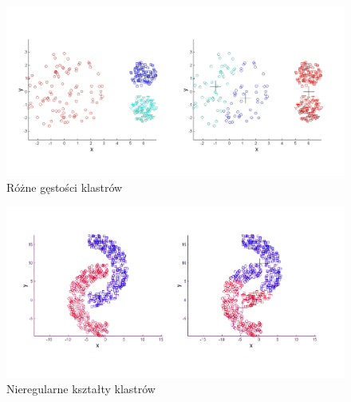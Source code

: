 \begin{figure}
\includegraphics[width=\textwidth]{img/kmeans_density}
\caption{Różne gęstości klastrów \cite{Luk}}
\end{figure}

\begin{figure}
\includegraphics[width=\textwidth]{img/kmeans_irregular}
\caption{Nieregularne kształty klastrów \cite{Luk}} 
\end{figure}